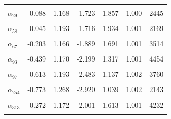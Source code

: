 \begin{longtable}{lrrrrrr}
\cellcolor{gray!10}{$\sigma_{\text{Sent}}$} & \cellcolor{gray!10}{0.659} & \cellcolor{gray!10}{0.550} & \cellcolor{gray!10}{0.048} & \cellcolor{gray!10}{1.700} & \cellcolor{gray!10}{1.011} & \cellcolor{gray!10}{435}\\
$\alpha_{29}$ & -0.088 & 1.168 & -1.723 & 1.857 & 1.000 & 2445\\
\cellcolor{gray!10}{$\alpha_{35}$} & \cellcolor{gray!10}{-0.309} & \cellcolor{gray!10}{1.135} & \cellcolor{gray!10}{-1.987} & \cellcolor{gray!10}{1.499} & \cellcolor{gray!10}{1.001} & \cellcolor{gray!10}{4285}\\
$\alpha_{58}$ & -0.045 & 1.193 & -1.716 & 1.934 & 1.001 & 2169\\
\cellcolor{gray!10}{$\alpha_{59}$} & \cellcolor{gray!10}{-0.265} & \cellcolor{gray!10}{1.130} & \cellcolor{gray!10}{-1.912} & \cellcolor{gray!10}{1.474} & \cellcolor{gray!10}{1.002} & \cellcolor{gray!10}{3876}\\
$\alpha_{67}$ & -0.203 & 1.166 & -1.889 & 1.691 & 1.001 & 3514\\
\cellcolor{gray!10}{$\alpha_{75}$} & \cellcolor{gray!10}{-0.369} & \cellcolor{gray!10}{1.206} & \cellcolor{gray!10}{-2.205} & \cellcolor{gray!10}{1.512} & \cellcolor{gray!10}{1.002} & \cellcolor{gray!10}{4088}\\
$\alpha_{93}$ & -0.439 & 1.170 & -2.199 & 1.317 & 1.001 & 4454\\
\cellcolor{gray!10}{$\alpha_{94}$} & \cellcolor{gray!10}{-0.391} & \cellcolor{gray!10}{1.188} & \cellcolor{gray!10}{-2.255} & \cellcolor{gray!10}{1.429} & \cellcolor{gray!10}{1.002} & \cellcolor{gray!10}{3863}\\
$\alpha_{97}$ & -0.613 & 1.193 & -2.483 & 1.137 & 1.002 & 3760\\
\cellcolor{gray!10}{$\alpha_{230}$} & \cellcolor{gray!10}{-0.338} & \cellcolor{gray!10}{1.146} & \cellcolor{gray!10}{-2.069} & \cellcolor{gray!10}{1.421} & \cellcolor{gray!10}{1.001} & \cellcolor{gray!10}{4546}\\
$\alpha_{254}$ & -0.773 & 1.268 & -2.920 & 1.039 & 1.002 & 2143\\
\cellcolor{gray!10}{$\alpha_{306}$} & \cellcolor{gray!10}{-0.605} & \cellcolor{gray!10}{1.162} & \cellcolor{gray!10}{-2.472} & \cellcolor{gray!10}{1.114} & \cellcolor{gray!10}{1.002} & \cellcolor{gray!10}{3591}\\
$\alpha_{313}$ & -0.272 & 1.172 & -2.001 & 1.613 & 1.001 & 4232\\
\cellcolor{gray!10}{$\alpha_{329}$} & \cellcolor{gray!10}{-0.305} & \cellcolor{gray!10}{1.163} & \cellcolor{gray!10}{-2.013} & \cellcolor{gray!10}{1.511} & \cellcolor{gray!10}{1.004} & \cellcolor{gray!10}{4032}\\

\end{longtable}
